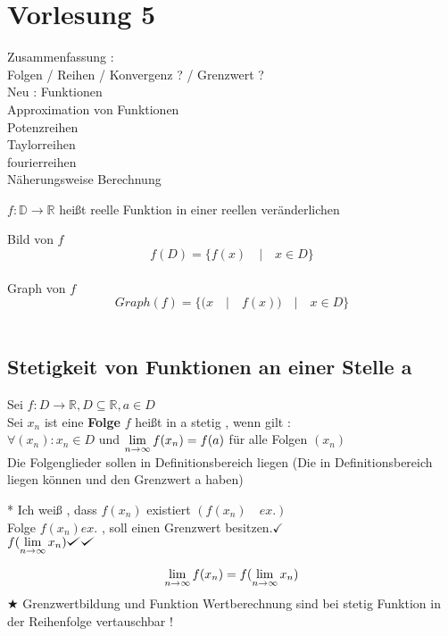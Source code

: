 \section{Vorlesung 5}

Zusammenfassung :\\
Folgen / Reihen / Konvergenz ? / Grenzwert ? \\ 
Neu : Funktionen\\ 
Approximation von Funktionen \\
Potenzreihen\\
Taylorreihen\\
fourierreihen\\
Näherungsweise Berechnung
\begin{definition}
$ f : \mathbb{D} \rightarrow \mathbb{R} $
heißt reelle Funktion in einer reellen veränderlichen  

\end{definition}

\begin{remark}[Definitionsbereich]
Bild von $f$ \[ f(D)= \{ f(x) \quad | \quad x \in D \} \] \\
Graph von $f$ \[ Graph(f)= \{( x \quad |\quad f(x)) \quad | \quad x \in D \} \] \\

\end{remark}   
\subsection{Stetigkeit von Funktionen an einer Stelle a }
\begin{definition}
Sei $f : D \rightarrow \mathbb{R} , D \subseteq \mathbb{R} , a \in D \quad $\\
Sei $x_n$ ist eine \textbf{Folge} 
$f$ heißt in a stetig , wenn gilt :\\
$\forall (x_n) : x_n \in D$ und 
$\lim\limits_{n \rightarrow \infty}{f(x_n)} = f(a)$ für alle Folgen $(x_n)$\\
Die Folgenglieder sollen in Definitionsbereich liegen (Die in Definitionsbereich liegen können und den Grenzwert a haben)
\end{definition}

* Ich weiß , dass $f(x_n)$ existiert $(f(x_n)\quad ex.)$\\
 Folge $f(x_n)ex.$ , soll einen Grenzwert besitzen.$\checkmark$\\
$f(\limNin{x_n})\checkmark \checkmark$

\begin{remark}
\[ \lim\limits_{n \rightarrow \infty} {f(x_n)= f(\lim\limits_{n \rightarrow \infty}{x_n})} \]
$\bigstar$ Grenzwertbildung und Funktion Wertberechnung sind bei stetig Funktion in der Reihenfolge vertauschbar !  
\end{remark} 

